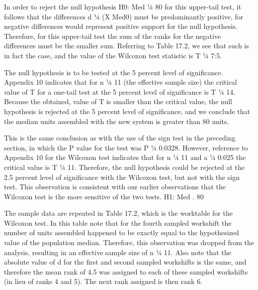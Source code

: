 In order to reject the null hypothesis H0: Med ¼ 80 for this upper-tail test, it follows that the differences
d ¼ (X   Med0) must be predominantly positive, for negative differences would represent positive support for
the null hypothesis. Therefore, for this upper-tail test the sum of the ranks for the negative differences must be
the smaller sum. Referring to Table 17.2, we see that such is in fact the case, and the value of the Wilcoxon test
statistic is T ¼ 7:5.

The null hypothesis is to be tested at the 5 percent level of significance. Appendix 10 indicates that for
n ¼ 11 (the effective sample size) the critical value of T for a one-tail test at the 5 percent level of
significance is T ¼ 14. Because the obtained, value of T is smaller than the critical value, the null hypothesis
is rejected at the 5 percent level of significance, and we conclude that the median units assembled with the
new system is greater than 80 units. 


This is the same conclusion as with the use of the sign test in the
preceding section, in which the P value for the test was P ¼ 0:0328. However, reference to Appendix 10 for
the Wilcoxon test indicates that for n ¼ 11 and a ¼ 0:025 the critical value is T ¼ 11. Therefore, the null
hypothesis could be rejected at the 2.5 percent level of significance with the Wilcoxon test, but not with the
sign test. This observation is consistent with our earlier observations that the Wilcoxon test is the more
sensitive of the two tests.
H1: Med . 80

The sample data are repeated in Table 17.2, which is the worktable for the Wilcoxon test. In this
table note that for the fourth sampled workshift the number of units assembled happened to be
exactly equal to the hypothesized value of the population median. Therefore, this observation was
dropped from the analysis, resulting in an effective sample size of n ¼ 11. Also note that the absolute
value of d for the first and second sampled workshifts is the same, and therefore the mean rank of 4.5
was assigned to each of these sampled workshifts (in lieu of ranks 4 and 5). The next rank assigned is
then rank 6.

